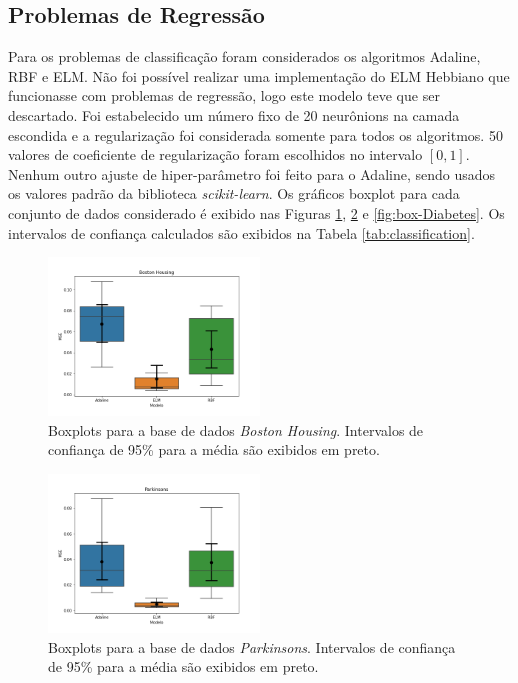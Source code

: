 \documentclass[conference]{IEEEtran}
\begin{document}
	\subsection{Problemas de Regressão}
	Para os problemas de classificação foram considerados os algoritmos Adaline, RBF e ELM. Não foi possível realizar uma implementação do ELM Hebbiano que funcionasse com problemas de regressão, logo este modelo teve que ser descartado. Foi estabelecido um número fixo de 20 neurônions na camada escondida e a regularização foi considerada somente para todos os algoritmos. 50 valores de coeficiente de regularização foram escolhidos no intervalo $[0,1]$. Nenhum outro ajuste de hiper-parâmetro foi feito para o Adaline, sendo usados os valores padrão da biblioteca \textit{scikit-learn}. Os gráficos boxplot para cada conjunto de dados considerado é exibido nas Figuras \ref{fig:box-Boston-Housing}, \ref{fig:box-Parkinsons} e \ref{fig:box-Diabetes}.  Os intervalos de confiança calculados são exibidos na Tabela \ref{tab:classification}.

	\begin{figure}[thpbh]
		\centering
		\includegraphics[width=0.5\textwidth]{figures/Boston Housing_scores.png}
		\caption{Boxplots para a base de dados \textit{Boston Housing}. Intervalos de confiança de 95\% para a média são exibidos em preto.}
		\label{fig:box-Boston-Housing}
	\end{figure}
	
	\begin{figure}[thpbh]
		\centering
		\includegraphics[width=0.5\textwidth]{figures/Parkinsons_scores.png}
		\caption{Boxplots para a base de dados \textit{Parkinsons}. Intervalos de confiança de 95\% para a média são exibidos em preto.}
		\label{fig:box-Parkinsons}
	\end{figure}
	
\end{document}
